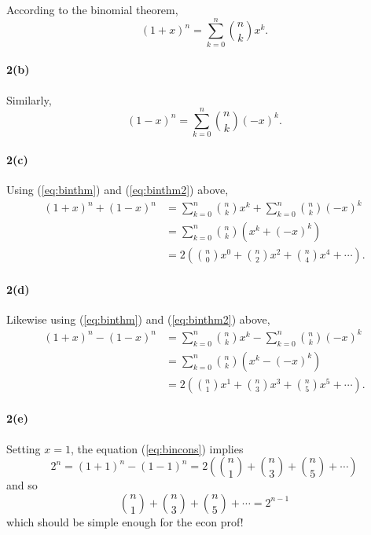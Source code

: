 \documentclass[
]{article}
\begin{document}
According to the binomial theorem, \begin{equation}
  \label{eq:binthm}
  (1+x)^n = \sum_{k=0}^{n}\binom{n}{k}x^k.
\end{equation}

\hypertarget{b-1}{%
\paragraph{2(b)}\label{b-1}}

Similarly, \begin{equation}
  \label{eq:binthm2}
  (1-x)^n = \sum_{k=0}^{n}\binom{n}{k}(-x)^k.
\end{equation}

\hypertarget{c}{%
\paragraph{2(c)}\label{c}}

Using (\ref{eq:binthm}) and (\ref{eq:binthm2}) above, \begin{align*}
  (1 + x)^n + (1 - x)^n
  &= \sum_{k=0}^{n}\binom{n}{k}x^k + \sum_{k=0}^{n}\binom{n}{k}(-x)^k\\
  &= \sum_{k=0}^{n}\binom{n}{k}(x^k + (-x)^k)\\
  &= 2\left(\binom{n}{0}x^0 + \binom{n}{2}x^2 + \binom{n}{4}x^4 + \cdots\right).
\end{align*}

\hypertarget{d}{%
\paragraph{2(d)}\label{d}}

Likewise using (\ref{eq:binthm}) and (\ref{eq:binthm2}) above,
\begin{align}
\label{eq:bincons}
  \nonumber (1 + x)^n - (1 - x)^n
  &= \sum_{k=0}^{n}\binom{n}{k}x^k - \sum_{k=0}^{n}\binom{n}{k}(-x)^k\\
  \nonumber
  &= \sum_{k=0}^{n}\binom{n}{k}(x^k - (-x)^k)\\
  &= 2\left(\binom{n}{1}x^1 + \binom{n}{3}x^3 + \binom{n}{5}x^5 + \cdots\right).
\end{align}

\hypertarget{e}{%
\paragraph{2(e)}\label{e}}

Setting \(x=1\), the equation (\ref{eq:bincons}) implies
\begin{equation*}
  2^n = (1 + 1)^n - (1 - 1)^n = 2\left(\binom{n}{1} + \binom{n}{3} + \binom{n}{5} + \cdots\right)
\end{equation*} and so \begin{equation*}
   \binom{n}{1} + \binom{n}{3} + \binom{n}{5} + \cdots = 2^{n-1}
\end{equation*} which should be simple enough for the econ prof!
\end{document}
